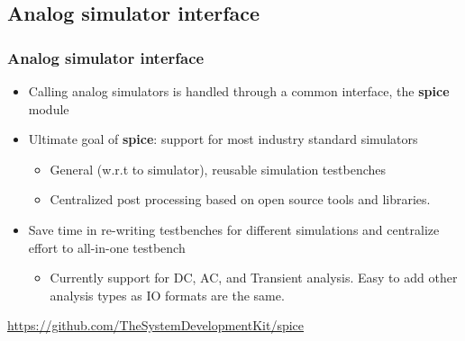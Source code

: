 \documentclass{sdkslides}
\newcommand{\sectname}{Section Name}
\begin{document}

\renewcommand{\sectname}{Analog simulator interface}
\subsection*{\sectname}
\begin{frame}[t]
    \frametitle{\sectname}
    \begin{itemize}
        \item Calling analog simulators is handled through a common interface, the \textbf{spice} module
        \item Ultimate goal of \textbf{spice}: support for most industry standard simulators
        \begin{itemize}
            \item General (w.r.t to simulator), reusable simulation testbenches
            \item Centralized post processing based on open source tools and
                libraries.
        \end{itemize}
            \item Save time in re-writing testbenches for different simulations and centralize effort to all-in-one testbench
        \begin{itemize}
        \item Currently support for DC, AC, and Transient analysis. Easy to
            add other analysis types as IO formats are the same. 
        \end{itemize}
    \end{itemize}
    {\tiny \url{https://github.com/TheSystemDevelopmentKit/spice}}
\end{frame}

\renewcommand{\sectname}{Digital simulator interface}
\end{document}

